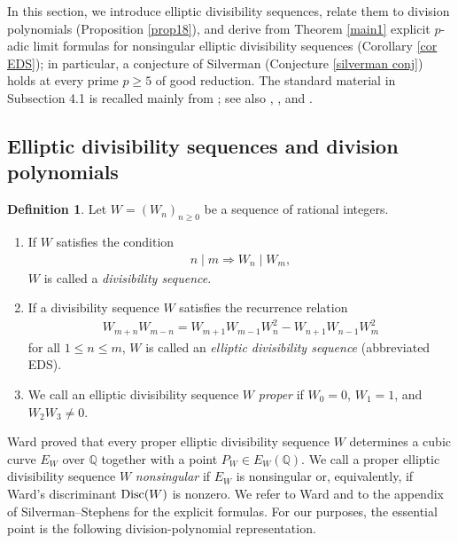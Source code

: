 \documentclass[11pt]{amsart}
\theoremstyle{definition}
\newtheorem{dfn}[thm]{Definition}
\newcommand{\Q}{\mathbb{Q}}
\begin{document}
In this section, we introduce elliptic divisibility sequences, relate them
to division polynomials (Proposition \ref{prop18}), and derive from
Theorem \ref{main1} explicit $p$-adic limit formulas for nonsingular
elliptic divisibility sequences (Corollary \ref{cor EDS}); in particular,
a conjecture of Silverman (Conjecture \ref{silverman conj}) holds at every
prime $p \geq 5$ of good reduction.
The standard material in Subsection 4.1 is recalled mainly from
\cite[Sections 8--10]{Si05a}; see also \cite{Ay92}, \cite{Ay93},
\cite{Sh00} and  \cite{Wa48}.


\subsection{Elliptic divisibility sequences and division polynomials}

\begin{dfn}
Let $W=(W_n)_{n \geq 0}$ be a sequence of rational integers.
\begin{enumerate}
\item If $W$ satisfies the condition
%
\begin{align*}
n \mid m \Rightarrow W_n \mid W_m,
\end{align*}
%
$W$ is called a {\it divisibility sequence}.
\item If a divisibility sequence $W$ satisfies the recurrence relation
%
\begin{align*}
W_{m+n}W_{m-n}=W_{m+1}W_{m-1}W_n^2-W_{n+1}W_{n-1}W_m^2
\end{align*}
%
for all $1 \leq n \leq m$, $W$ is called an {\it elliptic divisibility sequence} (abbreviated EDS).
\item We call an elliptic divisibility sequence $W$ {\it proper} if $W_0=0$, $W_1=1$, and $W_2W_3 \neq 0$.
\end{enumerate}
\end{dfn}

Ward \cite{Wa48} proved that every proper elliptic divisibility sequence $W$ determines a cubic curve $E_W$ over $\Q$ together with a point $P_W \in E_W(\Q)$.
We call a proper elliptic divisibility sequence $W$ {\it nonsingular} if
$E_W$ is nonsingular or, equivalently, if Ward's discriminant
${\rm Disc}(W)$ is nonzero.
We refer to Ward \cite{Wa48} and to the appendix of Silverman--Stephens \cite{SS06} for the explicit formulas. 
For our purposes, the essential point is the following
division-polynomial representation.
\end{document}
